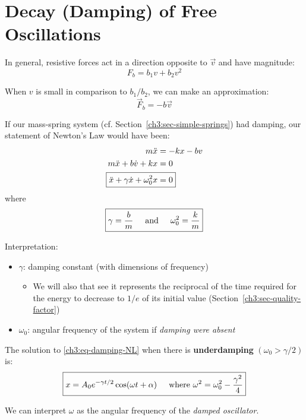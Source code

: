 \section{Decay (Damping) of Free Oscillations}

In general, resistive forces act in a direction opposite to $\vec{v}$ and have magnitude:
\[ F_b = b_1v + b_2v^2\]

When $v$ is small in comparison to $b_1/b_2$, we can make an approximation:
\begin{equation*}
	\boxed{\vec{F}_b = -b\vec{v}}
\end{equation*}

If our mass-spring system (cf. Section~\ref{ch3:sec-simple-springs}) had damping, our statement of Newton's Law would have been:
\begin{align}
	m\ddot{x} &= -kx - bv \notag \\
	m\ddot{x} + b\dot{v} + kx &= 0 \notag  \\
	\Aboxed{\ddot{x} + \gamma \dot{x} + \omega_0^2 x &= 0} \label{ch3:eq-damping-NL}
\end{align}
where
\[ \boxed{\gamma = \frac{b}{m} \hspace{0.5cm}\text{and}\hspace{0.5cm} \omega_0^2 = \frac{k}{m}} \]

Interpretation:
\begin{itemize}
	\item $\gamma$: damping constant (with dimensions of frequency)
	\begin{itemize}
		\item We will also that see it represents the reciprocal of the time required for the energy to decrease to $1/e$ of its initial value (Section~\ref{ch3:sec-quality-factor})
	\end{itemize}
	\item $\omega_0$: angular frequency of the system if \emph{damping were absent}
\end{itemize}

The solution to \eqref{ch3:eq-damping-NL} when there is \textbf{underdamping} $(\omega_0>\gamma/2)$ is:
\begin{equation}
	\boxed{
		x = A_0 e^{-\gamma t/2} \cos(\omega t + \alpha) \hspace{0.5cm}\text{where } \omega ^2 = \omega_0^2 - \frac{\gamma^2}{4} 
	}	\label{ch3:eq-damping-solution}
\end{equation}

We can interpret $\omega$ as the angular frequency of the \emph{damped oscillator}.


